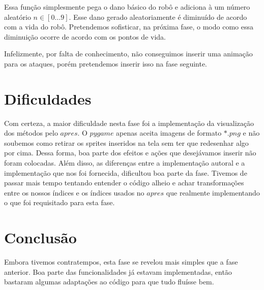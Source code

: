 \documentclass{article}
\begin{document}
    Essa função simplesmente pega o dano básico do robô e adiciona à um número aleatório $n \in [0\ldots9]$. Esse dano gerado aleatoriamente é diminuído de acordo com a vida do robô. Pretendemos sofisticar, na próxima fase, o modo como essa diminuição ocorre de acordo com os pontos de vida.
    
    Infelizmente, por falta de conhecimento, não conseguimos inserir uma animação para os ataques, porém pretendemos inserir isso na fase seguinte.
    
    \section{Dificuldades}
    
    Com certeza, a maior dificuldade nesta fase foi a implementação da visualização dos métodos pelo $apres$. O $pygame$ apenas aceita imagens de formato $*.png$ e não soubemos como retirar os sprites inseridos na tela sem ter que redesenhar algo por cima. Dessa forma, boa parte dos efeitos e ações que desejávamos inserir não foram colocadas. Além disso, as diferenças entre a implementação autoral e a implementação que nos foi fornecida, dificultou boa parte da fase. Tivemos de passar mais tempo tentando entender o código alheio e achar transformações entre os nossos índices e os índices usados no $apres$ que realmente implementando o que foi requisitado para esta fase.
    
    \section{Conclusão}
    Embora tivemos contratempos, esta fase se revelou mais simples que a fase anterior. Boa parte das funcionalidades já estavam implementadas, então bastaram algumas adaptações ao código para que tudo fluísse bem. 
\end{document}
